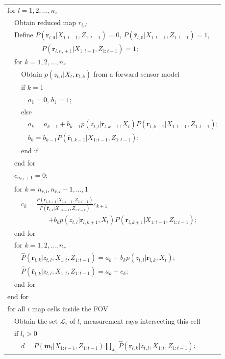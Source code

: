 \documentclass[letterpaper, 10pt, conference]{ieeeconf}
\begin{document}
\begin{table}
\begin{tabular}{ l }
  for $l = 1,2,\ldots,n_z$\\
   \ \ Obtain reduced map $r_{t,l}$\\
   \ \ Define $P(\mathbf{r}_{l,0}|X_{1:t-1},Z_{1:t-1})=0$, $P(\bar{\mathbf{r}}_{l,0}|X_{1:t-1},Z_{1:t-1})=1$, \\  \ \ \ \ \ \ \ \ \ \   $P(\mathbf{r}_{l,n_r+1}|X_{1:t-1},Z_{1:t-1})=1$;\\
   \ \ for $k = 1,2,\ldots,n_r$\\
   \ \ \ \ Obtain $p(z_{t,l}|X_t,\mathbf{r}_{l,k})$ from a forward sensor model\\
   \ \ \ \ if $k=1$\\
   \ \ \ \ \ \ $a_1=0$, $b_1=1$;\\
   \ \ \ \ else\\
   \ \ \ \ \ \ $a_k=a_{k-1}+b_{k-1}p(z_{t,l}|\mathbf{r}_{l,k-1},X_t)P(\mathbf{r}_{l,k-1}|X_{1:t-1},Z_{1:t-1})$;\\
   \ \ \ \ \ \ $b_k=b_{k-1}P(\bar{\mathbf{r}}_{l,k-1}|X_{1:t-1},Z_{1:t-1})$;\\
   \ \ \ \ end if\\
   \ \ end for\\
   \ \ $c_{n_{r,l}+1}=0$;\\
   \ \ for $k = n_{r,l},n_{r,l}-1,\ldots,1$\\
   \ \ \ \ $c_k=\frac{P(\mathbf{r}_{l,k+1}|X_{1:t-1},Z_{1:t-1})}{P(\bar{\mathbf{r}}_{l,k}|X_{1:t-1},Z_{1:t-1})}c_{k+1}$\\
   \ \ \ \ \ \ \ \ \ \ \ \ $+b_{k}p(z_{t,l}|\mathbf{r}_{l,k+1},X_t)P(\mathbf{r}_{l,k+1}|X_{1:t-1},Z_{1:t-1})$;\\
   \ \ end for\\
   \ \ for $k = 1,2,\ldots,n_r$\\
   \ \ \ \ $\hat P(\mathbf{r}_{l,k}|z_{t,l},X_{1:t},Z_{1:t-1})=a_k+b_kp(z_{t,l}|\mathbf{r}_{l,k},X_t)$;\\
   \ \ \ \ $\hat P(\bar{\mathbf{r}}_{l,k}|z_{t,l},X_{1:t},Z_{1:t-1})=a_k+c_k$;\\
   \ \ end for\\
   end for\\
   for all $i$ map cells inside the FOV\\
   \ \ Obtain the set $\mathcal L_i$ of $l_i$ measurement rays intersecting this cell\\
   \ \ if $l_i>0$\\
   \ \ \ \ $d=P(\mathbf{m}_i|X_{1:t-1},Z_{1:t-1})\prod_{\mathcal L_i}\hat P(\mathbf{r}_{l,k}|z_{t,l},X_{1:t},Z_{1:t-1})$;\\

\end{tabular}
\end{table}
\end{document}
